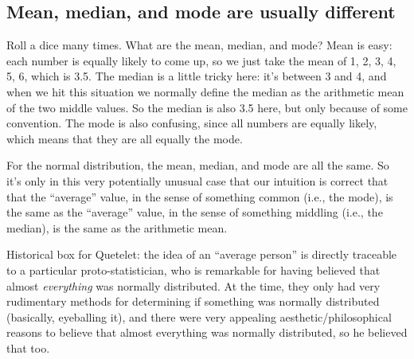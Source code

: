 \subsection{Mean, median, and mode are usually
different}\label{mean-median-and-mode-are-usually-different}

Roll a dice many times. What are the mean, median, and mode? Mean is
easy: each number is equally likely to come up, so we just take the mean
of 1, 2, 3, 4, 5, 6, which is 3.5. The median is a little tricky here:
it's between 3 and 4, and when we hit this situation we normally define
the median as the arithmetic mean of the two middle values. So the
median is also 3.5 here, but only because of some convention. The mode
is also confusing, since all numbers are equally likely, which means
that they are all equally the mode.

For the normal distribution, the mean, median, and mode are all the
same. So it's only in this very potentially unusual case that our
intuition is correct that that the ``average'' value, in the sense of
something common (i.e., the mode), is the same as the ``average'' value,
in the sense of something middling (i.e., the median), is the same as
the arithmetic mean.

Historical box for Quetelet: the idea of an ``average person'' is
directly traceable to a particular proto-statistician, who is remarkable
for having believed that almost \emph{everything} was normally
distributed. At the time, they only had very rudimentary methods for
determining if something was normally distributed (basically, eyeballing
it), and there were very appealing aesthetic/philosophical reasons to
believe that almost everything was normally distributed, so he believed
that too.
